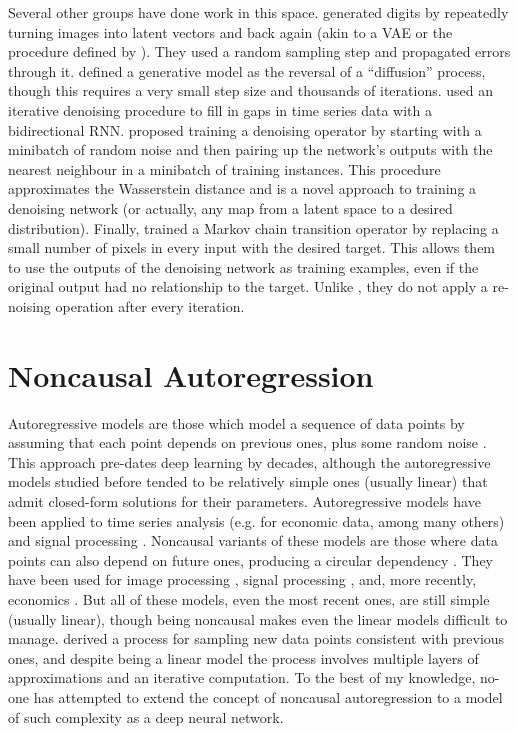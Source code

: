 \documentclass[11pt, a4paper, openany]{book}
\newcommand{\nquote}[1]{``{#1}''}
\begin{document}
Several other groups have done work in this space. \citet{markovinference} generated digits by repeatedly turning images into latent vectors and back again (akin to a VAE or the procedure defined by \citet{gsn}). They used a random sampling step and propagated errors through it. \citet{denoisingthermo} defined a generative model as the reversal of a \nquote{diffusion} process, though this requires a very small step size and thousands of iterations. \citet{brnndenoise} used an iterative denoising procedure to fill in gaps in time series data with a bidirectional RNN. \citet{iterativeclosest} proposed training a denoising operator by starting with a minibatch of random noise and then pairing up the network's outputs with the nearest neighbour in a minibatch of training instances. This procedure approximates the Wasserstein distance and is a novel approach to training a denoising network (or actually, any map from a latent space to a desired distribution). Finally, \citet{infusion} trained a Markov chain transition operator by replacing a small number of pixels in every input with the desired target. This allows them to use the outputs of the denoising network as training examples, even if the original output had no relationship to the target. Unlike \citet{denoisinggenerative}, they do not apply a re-noising operation after every iteration.

\section{Noncausal Autoregression}

Autoregressive models are those which model a sequence of data points by assuming that each point depends on previous ones, plus some random noise \citep{autoregressive1}. This approach pre-dates deep learning by decades, although the autoregressive models studied before tended to be relatively simple ones (usually linear) that admit closed-form solutions for their parameters. Autoregressive models have been applied to time series analysis (e.g. for economic data, among many others) and signal processing \citep{timeseries}. Noncausal variants of these models are those where data points can also depend on future ones, producing a circular dependency \citep{noncausallikelihood}. They have been used for image processing \citep{noncausalimage1,noncausalimage2}, signal processing \citep{noncausalsignal}, and, more recently, economics \citep{noncausaleco1,noncausaleco2}. But all of these models, even the most recent ones, are still simple (usually linear), though being noncausal makes even the linear models difficult to manage. \citet{noncausaleco2} derived a process for sampling new data points consistent with previous ones, and despite being a linear model the process involves multiple layers of approximations and an iterative computation. To the best of my knowledge, no-one has attempted to extend the concept of noncausal autoregression to a model of such complexity as a deep neural network.
\end{document}
